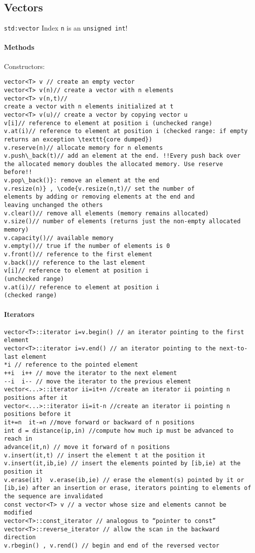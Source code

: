\documentclass{article}
\newcommand{\code}[1]{\texttt {#1}}
\begin{document}
\subsection{Vectors}
\texttt{std:vector}
Index \texttt{n} is an \texttt{unsigned int}!
\paragraph{Methods}

Constructors:
\begin{lstlisting}
vector<T> v // create an empty vector
vector<T> v(n)// create a vector with n elements
vector<T> v(n,t)//
create a vector with n elements initialized at t
vector<T> v(u)// create a vector by copying vector u
v[i]// reference to element at position i (unchecked range)
v.at(i)// reference to element at position i (checked range: if empty returns an exception \texttt{core dumped})
v.reserve(n)// allocate memory for n elements
v.push\_back(t)// add an element at the end. !!Every push back over the allocated memory doubles the allocated memory. Use reserve before!!
v.pop\_back()}: remove an element at the end
v.resize(n)} , \code{v.resize(n,t)// set the number of
elements by adding or removing elements at the end and
leaving unchanged the others
v.clear()// remove all elements (memory remains allocated)
v.size()// number of elements (returns just the non-empty allocated memory)
v.capacity()// available memory
v.empty()// true if the number of elements is 0
v.front()// reference to the first element
v.back()// reference to the last element
v[i]// reference to element at position i
(unchecked range)
v.at(i)// reference to element at position i
(checked range)
\end{lstlisting}

\paragraph{Iterators}
\begin{lstlisting}
vector<T>::iterator i=v.begin() // an iterator pointing to the first element
vector<T>::iterator i=v.end() // an iterator pointing to the next-to-last element
*i // reference to the pointed element
++i  i++ // move the iterator to the next element
--i  i-- // move the iterator to the previous element
vector<...>::iterator ii=it+n //create an iterator ii pointing n positions after it
vector<...>::iterator ii=it-n //create an iterator ii pointing n positions before it
it+=n  it-=n //move forward or backward of n positions
int d = distance(ip,in) //compute how much ip must be advanced to reach in
advance(it,n) // move it forward of n positions
v.insert(it,t) // insert the element t at the position it
v.insert(it,ib,ie) // insert the elements pointed by [ib,ie) at the position it
v.erase(it)  v.erase(ib,ie) // erase the element(s) pointed by it or [ib,ie) after an insertion or erase, iterators pointing to elements of
the sequence are invalidated
const vector<T> v // a vector whose size and elements cannot be modified
vector<T>::const_iterator // analogous to “pointer to const”
vector<T>::reverse_iterator // allow the scan in the backward direction
v.rbegin() , v.rend() // begin and end of the reversed vector
\end{lstlisting}
\end{document}
